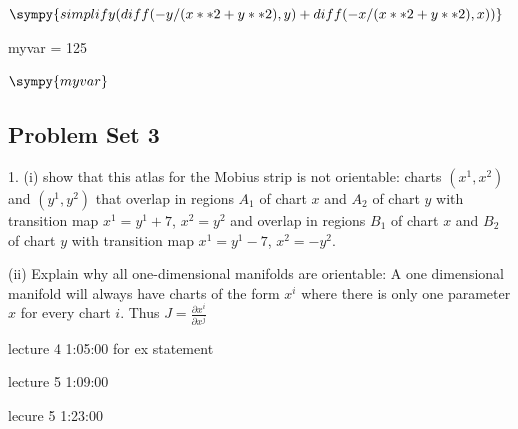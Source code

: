 \documentclass{article}\usepackage[]{graphicx}\usepackage[]{color}
\begin{document}
$\sympy{simplify(diff(-y/(x**2+y**2),y)+diff(-x/(x**2+y**2),x))}$


\begin{sympycode}
myvar = 125
\end{sympycode}

$\sympy{myvar}$

\subsection{Problem Set 3}


1. (i) show that this atlas for the Mobius strip  is not orientable: charts $(x^1,x^2)$ and $(y^1,y^2)$ that overlap in regions $A_1$ of chart $x$ and $A_2$ of chart $y$ with transition map $x^1=y^1+7$, $x^2=y^2$ and overlap in regions $B_1$ of chart $x$ and $B_2$ of chart $y$ with transition map $x^1=y^1-7$, $x^2=-y^2$.

(ii) Explain why all one-dimensional manifolds are orientable: A one dimensional manifold will always have charts of the form $x^i$ where there is only one parameter $x$ for every chart $i$. Thus $J=\frac{\partial x^i}{\partial x^j}$





lecture 4 1:05:00 for ex statement

lecture 5 1:09:00

lecure 5 1:23:00



{}

\end{document}
